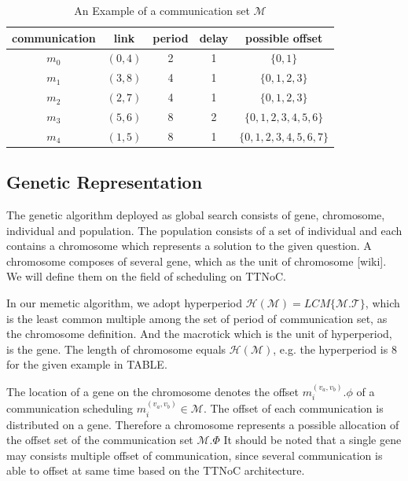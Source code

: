 \documentclass[jornal]{IEEEtran}
\begin{document}
\begin{table}[!t]
	\renewcommand{\arraystretch}{1.3}
	\caption{An Example of a communication set $\mathcal{M}$}
	\label{t:comm_info}
	\centering
	\begin{tabular}{|c||c||c||c||c|}
		\hline
		communication & link & period & delay & possible offset\\
		\hline
		$m_{0}$ & $ (0,4) $ & 2 & 1 & $\{0,1\}$\\
		\hline
		$m_{1}$ & $ (3,8) $ & 4 & 1 & $\{0,1,2,3\}$\\
		\hline
		$m_{2}$ & $ (2,7) $ & 4 & 1 & $\{0,1,2,3\}$\\
		\hline		
		$m_{3}$ & $ (5,6) $ & 8 & 2 & $\{0,1,2,3,4,5,6\}$\\
		\hline
		$m_{4}$ & $ (1,5) $ & 8 & 1 & $\{0,1,2,3,4,5,6,7\}$\\
		\hline		
	\end{tabular}
\end{table}

\subsection{Genetic Representation}

The genetic algorithm deployed as global search consists of gene, chromosome, individual and population. The population consists of a set of individual and each contains a chromosome which represents a solution to the given question. A chromosome composes of several gene, which as the unit of chromosome [wiki]. We will define them on the field of scheduling on TTNoC.

In our memetic algorithm, we adopt hyperperiod  $\mathcal{H(M)} = LCM\{\mathcal{M.T}\}$, which is the least common multiple among the set of period of communication set, as the chromosome definition. And the macrotick which is the unit of hyperperiod, is the gene. The length of chromosome equals $\mathcal{H(M)}$, e.g. the hyperperiod is 8 for the given example in TABLE. 

The location of a gene on the chromosome denotes the offset $ m_{i}^{(v_{a},v_{b})}.\phi $ of a communication scheduling $ {m_{i}^{(v_{a},v_{b})}\in\mathcal{M}} $. The offset of each communication is distributed on a gene. Therefore a chromosome represents a possible allocation of the offset set of the communication set $\mathcal{M}.\Phi$ It should be noted that a single gene may consists multiple offset of communication, since several communication is able to offset at same time based on the TTNoC architecture.
\end{document}
